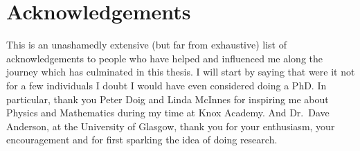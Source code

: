 \documentclass[a4paper,11pt,twoside,openright]{book}
\begin{document}






\chapter*{A\lowercase{cknowledgements}}
This is an unashamedly extensive (but far from exhaustive) list of acknowledgements to people who have helped and influenced me along the journey which has culminated in this thesis. I will start by saying that were it not for a few individuals I doubt I would have even considered doing a PhD. In particular, thank you Peter Doig and Linda McInnes for inspiring me about Physics and Mathematics during my time at Knox Academy. And Dr.\ Dave Anderson, at the University of Glasgow, thank you for your enthusiasm, your encouragement and for first sparking the idea of doing research.
\end{document}
